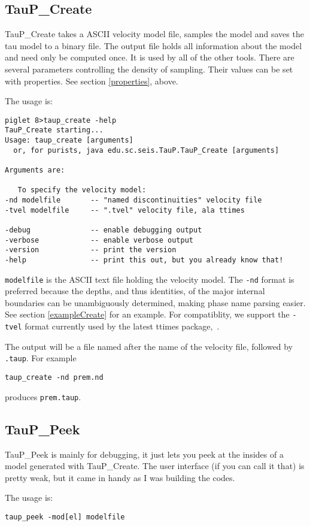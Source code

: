\subsection{TauP\_Create}

TauP\_Create takes a ASCII velocity model file, samples the model
 and saves the tau model to a binary file. 
The output file holds all 
information about the model and need only be computed once. It
is used by all of the other tools. There are several parameters controlling
the density of sampling. Their values can be set with properties. See section
\ref{properties}, above.

The usage is:
\begin{verbatim}
piglet 8>taup_create -help
TauP_Create starting...
Usage: taup_create [arguments]
  or, for purists, java edu.sc.seis.TauP.TauP_Create [arguments]

Arguments are:

   To specify the velocity model:
-nd modelfile       -- "named discontinuities" velocity file
-tvel modelfile     -- ".tvel" velocity file, ala ttimes

-debug              -- enable debugging output
-verbose            -- enable verbose output
-version            -- print the version
-help               -- print this out, but you already know that!
\end{verbatim} 
 
\texttt{modelfile} is the ASCII text file holding the velocity model.
The \texttt{-nd} format is preferred 
because the depths, and thus identities, of the major internal boundaries can 
be unambiguously determined, making phase name parsing easier. 
See section \ref{exampleCreate} for an example.
For compatiblity, we support the \texttt{-tvel} format 
currently used by the latest ttimes package,~. 

The output will be a file named after the name of the 
velocity file, followed by \texttt{.taup}. For example

\texttt{taup\_create -nd prem.nd}

produces \texttt{prem.taup}.

\subsection{TauP\_Peek}
TauP\_Peek is mainly for debugging, it just lets you peek at the insides
of a model generated with TauP\_Create. The user interface (if you can call it
that) is pretty weak, but it came in handy as I was building the codes.

The usage is:
\begin{verbatim}
taup_peek -mod[el] modelfile
\end{verbatim} 

